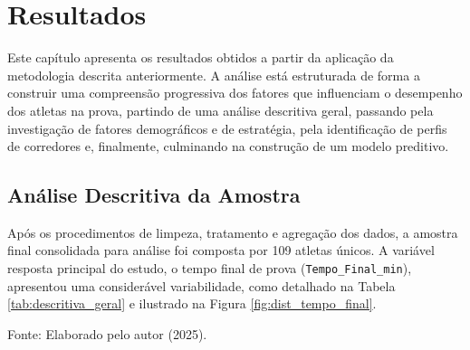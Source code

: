 \chapter{Resultados}
\label{chap:resultados}

Este capítulo apresenta os resultados obtidos a partir da aplicação da metodologia descrita anteriormente. A análise está estruturada de forma a construir uma compreensão progressiva dos fatores que influenciam o desempenho dos atletas na prova, partindo de uma análise descritiva geral, passando pela investigação de fatores demográficos e de estratégia, pela identificação de perfis de corredores e, finalmente, culminando na construção de um modelo preditivo.

\section{Análise Descritiva da Amostra}

Após os procedimentos de limpeza, tratamento e agregação dos dados, a amostra final consolidada para análise foi composta por 109 atletas únicos. A variável resposta principal do estudo, o tempo final de prova (\texttt{Tempo\_Final\_min}), apresentou uma considerável variabilidade, como detalhado na Tabela \ref{tab:descritiva_geral} e ilustrado na Figura \ref{fig:dist_tempo_final}.

\begin{table}[]
\centering
\caption{Estatísticas descritivas das principais variáveis de desempenho (N=109).}
\label{tab:descritiva_geral}
\end{table}
\begin{flushleft}
    \footnotesize Fonte: Elaborado pelo autor (2025).
\end{flushleft}

